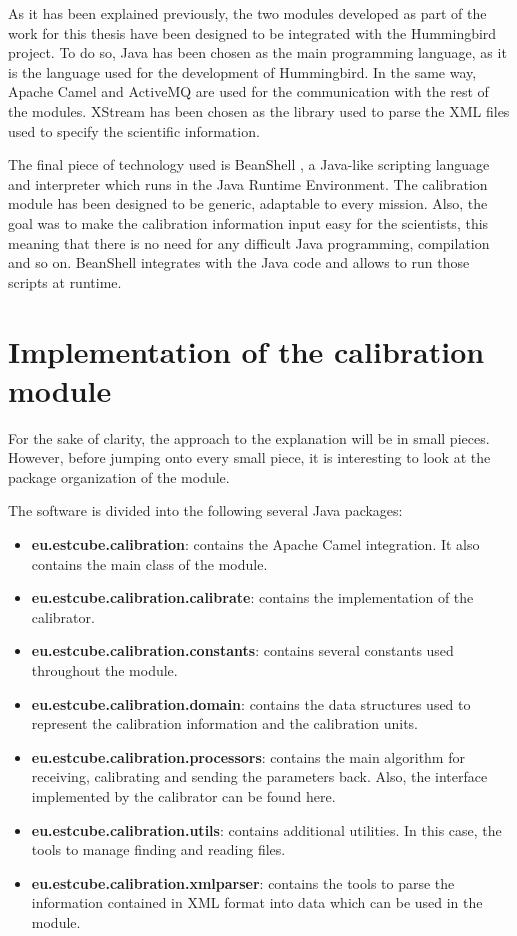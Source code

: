 As it has been explained previously, the two modules developed as part of the work for this thesis have been designed to be integrated with the Hummingbird project. To do so, Java \cite{Java} has been chosen as the main programming language, as it is the language used for the development of Hummingbird. In the same way, Apache Camel \cite{Camel} and ActiveMQ \cite{AMQ} are used for the communication with the rest of the modules. XStream \cite{XStream} has been chosen as the library used to parse the XML \cite{XML} files used to specify the scientific information.

The final piece of technology used is BeanShell \citep{BSH}, a Java-like scripting language and interpreter which runs in the Java Runtime Environment. The calibration module has been designed to be generic, adaptable to every mission. Also, the goal was to make the calibration information input easy for the scientists, this meaning that there is no need for any difficult Java programming, compilation and so on. BeanShell integrates with the Java code and allows to run those scripts at runtime.
\pagebreak
\section{Implementation of the calibration module}

For the sake of clarity, the approach to the explanation will be in small pieces. However, before jumping onto every small piece, it is interesting to look at the package organization of the module.

The software is divided into the following several Java packages:
\begin{itemize}
\item \textbf{eu.estcube.calibration}: contains the Apache Camel integration. It also contains the main class of the module.
\item \textbf{eu.estcube.calibration.calibrate}: contains the implementation of the calibrator.
\item \textbf{eu.estcube.calibration.constants}: contains several constants used throughout the module.
\item \textbf{eu.estcube.calibration.domain}: contains the data structures used to represent the calibration information and the calibration units.
\item \textbf{eu.estcube.calibration.processors}: contains the main algorithm for receiving, calibrating and sending the parameters back. Also, the interface implemented by the calibrator can be found here.
\item \textbf{eu.estcube.calibration.utils}: contains additional utilities. In this case, the tools to manage finding and reading files.
\item \textbf{eu.estcube.calibration.xmlparser}: contains the tools to parse the information contained in XML format into data which can be used in the module.
\end{itemize}

